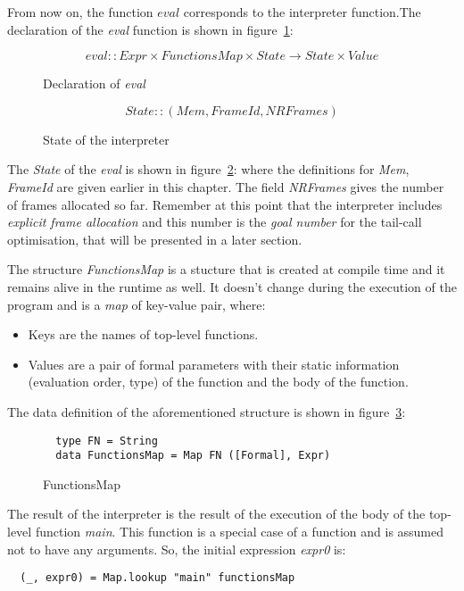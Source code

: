 \documentclass[diploma]{softlab-thesis}
\begin{document}
From now on, the function $\mathit{eval}$ corresponds to the interpreter function.The declaration of the \textit{eval} 
function is shown in figure~\ref{fig:eval}:

\begin{figure}[h]
  \[
    \mathit{eval} :: \mathit{Expr} \times \mathit{FunctionsMap} \times \mathit{State} \rightarrow 
    \mathit{State} \times \mathit{Value}
  \]
\caption{Declaration of \textit{eval}\label{fig:eval}}
\end{figure}

\begin{figure}[t]

\[
  \mathit{State :: (Mem, FrameId, NRFrames)}
\]

\caption{State of the interpreter\label{fig:state}}
\end{figure} 

The \textit{State} of the \textit{eval} is shown in figure~\ref{fig:state}:
where the definitions for \textit{Mem}, \textit{FrameId} are given earlier in this chapter. The field \textit{NRFrames}
gives the number of frames allocated so far. Remember at this point that the interpreter includes \textit{explicit frame 
allocation} and this number is the \textit{goal number} for the tail-call optimisation, that will be presented in a 
later section.

The structure \textit{FunctionsMap} is a stucture that is created at compile time and it remains alive in the runtime 
as well. It doesn't change during the execution of the program and is a \textit{map} of key-value pair, where:
\begin{itemize} 
  \item Keys are the names of top-level functions.
  \item Values are a pair of formal parameters with their static information (evaluation order, type) 
  of the function and the body of the function.
\end{itemize}

The data definition of the aforementioned structure is shown in figure~\ref{fig:functionsmap}:
\begin{figure}[h]
\begin{verbatim}
  type FN = String 
  data FunctionsMap = Map FN ([Formal], Expr)
\end{verbatim}
\caption{FunctionsMap\label{fig:functionsmap}}
\end{figure}
The result of the interpreter is the result of the execution of the body of the top-level function \textit{main}. 
This function is a special case of a function and is assumed not to have any arguments. So, the initial expression 
\textit{expr0} is: 
\begin{verbatim}
  (_, expr0) = Map.lookup "main" functionsMap
\end{verbatim}
\end{document}
